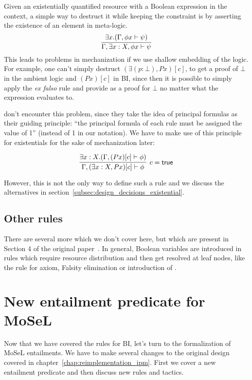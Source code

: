 Given an existentially quantified resource with a Boolean expression in the context, a simple way to destruct it while keeping the constraint is by asserting the existence of an element in meta-logic.
\[\infer{\Gamma, \exists x : X, \phi x \vdash \psi}
        { \exists x. (\Gamma, \phi x \vdash \psi)}\]
This leads to problems in mechanization if we use shallow embedding of the logic.
For example, one can't simply destruct \((\exists (p : \bot), P x)[c]\), to get a proof of \(\bot\) in the ambient logic and \((P x)[c]\) in BI, since then it is possible to simply apply the \emph{ex falso} rule and provide  as a proof for \(\bot\) no matter what the expression evaluates to.

\citet[page 5]{harlandResourceDistributionBooleanConstraints2003} don't encounter this problem, since they take the idea of principal formulas as their guiding principle: ``the principal formula of each rule must be assigned the value of 1'' (\true instead of 1 in our notation).
We have to make use of this principle for existentials for the sake of mechanization later:

\[
\infer[c = \true]
      {\Gamma, (\exists x : X, P x)[c] \vdash \phi}
      {\exists x : X . (\Gamma, (P x)[c] \vdash \phi)}
\]

However, this is not the only way to define such a rule and we discuss the alternatives in section~\ref{subsec:design_decisions_existential}.

\subsection{Other rules}
\label{subsec:other-rules}

There are several more which we don't cover here, but which are present in Section 4 of the original paper~\cite{harlandResourceDistributionBooleanConstraints2003}.
In general, Boolean variables are introduced in rules which require resource distribution and then get resolved at leaf nodes, like the rule for axiom, Falsity elimination or introduction of \emp.

\section{New entailment predicate for MoSeL}

Now that we have covered the rules for BI, let's turn to the formalization of MoSeL entailments.
We have to make several changes to the original design covered in chapter~\ref{chap:reimplementation_ipm}.
First we cover a new entailment predicate and then discuss new rules and tactics.

